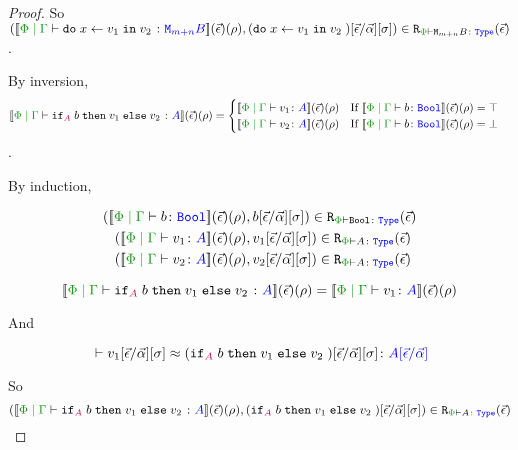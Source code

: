\begin{framed}
\begin{proof}
        So $\inLogRelPE{\deno{\gpetyperelation{\doin{x}{v_1}{v_2}}{\M{m+n}{B}}}\fundRho}{(\doin{x}{v_1}{v_2})\fundSub}{\M{m+n}{B}}$.
        
        
        
        \case{\vif}
        
        By inversion, $$\deno{\gpetyperelation{\pifthenelse{A}{b}{v_1}{v_2}}{A}}\fundRho = \begin{cases}
            \deno{\gpetyperelation{v_1}{A}}\fundRho \qt{If }\deno{\gpetyperelation{b}{\B}}\fundRho = \top\\
            \deno{\gpetyperelation{v_2}{A}}\fundRho \qt{If }\deno{\gpetyperelation{b}{\B}}\fundRho = \bot
        \end{cases}
        $$.
        
        By induction,
        
        \begin{align*}
            \inLogRelPE{\deno{\gpetyperelation{b}{\B}&}\fundRho}{b\fundSub}{\B}\\
            \inLogRelPE{\deno{\gpetyperelation{v_1}{A}&}\fundRho}{v_1\fundSub}{A}\\
            \inLogRelPE{\deno{\gpetyperelation{v_2}{A}&}\fundRho}{v_2\fundSub}{A}
        \end{align*}
        
        
        \begin{equation}
            \deno{\gpetyperelation{\pifthenelse{A}{b}{v_1}{v_2}}{A}}\fundRho = \deno{\gpetyperelation{v_1}{A}}\fundRho
        \end{equation}
        
        And
        
        \begin{equation}
           \zberelation{ v_1\fundSub}{(\pifthenelse{A}{b}{v_1}{v_2})\fundSub}{A\ssub{\av}{\ev}}
        \end{equation}
        
        So
        \begin{equation}
                \inLogRelPE{\deno{\gpetyperelation{\pifthenelse{A}{b}{v_1}{v_2}}{A}}\fundRho}{(\pifthenelse{A}{b}{v_1}{v_2})\fundSub}{A}
            \end{equation}
        
        

\end{proof}
\end{framed}
